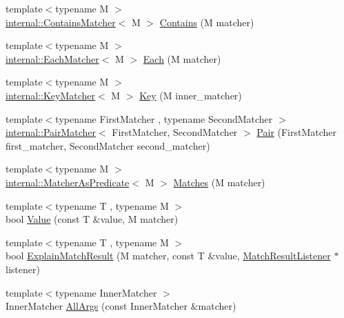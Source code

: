 \begin{DoxyCompactItemize}
\item 
{\footnotesize template$<$typename M $>$ }\\\hyperlink{classtesting_1_1internal_1_1_contains_matcher}{internal\+::\+Contains\+Matcher}$<$ M $>$ \hyperlink{namespacetesting_a2a12af7db4752797d06c1182b2470933}{Contains} (M matcher)
\item 
{\footnotesize template$<$typename M $>$ }\\\hyperlink{classtesting_1_1internal_1_1_each_matcher}{internal\+::\+Each\+Matcher}$<$ M $>$ \hyperlink{namespacetesting_a42743c985b1e02dc373ab7517ca1e740}{Each} (M matcher)
\item 
{\footnotesize template$<$typename M $>$ }\\\hyperlink{classtesting_1_1internal_1_1_key_matcher}{internal\+::\+Key\+Matcher}$<$ M $>$ \hyperlink{namespacetesting_a6212e76b542f4ffd3079de59092a826a}{Key} (M inner\+\_\+matcher)
\item 
{\footnotesize template$<$typename First\+Matcher , typename Second\+Matcher $>$ }\\\hyperlink{classtesting_1_1internal_1_1_pair_matcher}{internal\+::\+Pair\+Matcher}$<$ First\+Matcher, Second\+Matcher $>$ \hyperlink{namespacetesting_ac7520de8af26d3085513eeeb68561889}{Pair} (First\+Matcher first\+\_\+matcher, Second\+Matcher second\+\_\+matcher)
\item 
{\footnotesize template$<$typename M $>$ }\\\hyperlink{classtesting_1_1internal_1_1_matcher_as_predicate}{internal\+::\+Matcher\+As\+Predicate}$<$ M $>$ \hyperlink{namespacetesting_ad53b509ae9cd51040d67f668f99702ae}{Matches} (M matcher)
\item 
{\footnotesize template$<$typename T , typename M $>$ }\\bool \hyperlink{namespacetesting_ae44c50a3a7f0a46f05c8a0b0592b4a62}{Value} (const T \&value, M matcher)
\item 
{\footnotesize template$<$typename T , typename M $>$ }\\bool \hyperlink{namespacetesting_a6d5fbd5104dafc63bf705dafbcb5ce18}{Explain\+Match\+Result} (M matcher, const T \&value, \hyperlink{classtesting_1_1_match_result_listener}{Match\+Result\+Listener} $\ast$listener)
\item 
{\footnotesize template$<$typename Inner\+Matcher $>$ }\\Inner\+Matcher \hyperlink{namespacetesting_a2522e94b71f88fbfbbcf6942cd0c6ee0}{All\+Args} (const Inner\+Matcher \&matcher)
\item 

\end{DoxyCompactItemize}
